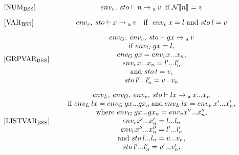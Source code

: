 \begin{equation}\label{EQ:SemainticsArithmeticExprNUM}
\begin{minipage}{.2\linewidth}
$[\text{NUM}_\text{BSS}]$
\end{minipage}
\begin{minipage}{.8\linewidth}
\centering
$env_v, \: sto \vdash n \xrightarrow{}\textsubscript{a} \: v$ $ \: \text{if}$ $\mathcal{N}[\![n]\!]$ $=$ $v$ 
\end{minipage}
\end{equation}

\begin{equation}
\begin{minipage}{.2\linewidth}
$[\text{VAR}_\text{BSS}]$
\end{minipage}
\begin{minipage}{.8\linewidth}
\centering
$env_v, \: sto \vdash x \xrightarrow{}\textsubscript{a} \: v$ $ \:\:\: \text{if} \:\:\: env_v \: x = l$ and $sto \: l = v$ 
\end{minipage}
\end{equation}

\begin{equation}
\begin{minipage}{.2\linewidth}
$[\text{GRPVAR}_\text{BSS}]$
\end{minipage}
\begin{minipage}{.8\linewidth}
\centering
$env_G, \: env_v, \: sto \vdash gx \xrightarrow{}\textsubscript{a} \: v$ \\ if $env_G \: gx = l,$ \\ $env_G \: gx = env_v x...x_n,$ \\ $env_v x...x_n = l'...l'_n$ \\ and $sto \: l = v,$ \\$sto \: l'...l'_n = v...v_n$ 
\end{minipage}
\end{equation}

\begin{equation}
\begin{minipage}{.2\linewidth}
$[\text{LISTVAR}_\text{BSS}]$
\end{minipage}
\begin{minipage}{.8\linewidth}
\centering
$env_L, \: env_G, \: env_v, \: sto \vdash lx \xrightarrow{}\textsubscript{a} \: x...x_n$  \\ if $env_L \: lx = env_G \: gx...gx_n \: \text{and} \: env_L \: lx = env_v \: x'...x'_n,$ \\ where $env_G \: gx...gx_n = env_v x''...x''_n,$ \\ $env_v x'...x'_n = l...l_n$ \\ $env_v x''...x''_n = l'...l'_n$ \\ and $sto \: l...l_n = v...v_n,$\\ $sto \: l'...l'_n = v'...v'_n,$
\end{minipage}
\end{equation}

